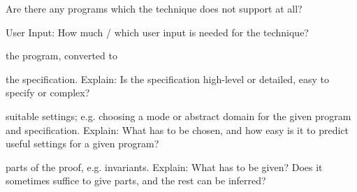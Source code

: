 \documentclass[a4paper]{article}
\begin{document}
\begin{minipage}[t]{0.16\linewidth}
\begin{betterlist}
\begin{betterlist}
\begin{betterlist}
			\end{betterlist}
			\item Are there any programs which the technique does not support at all?

		\end{betterlist}
		\item \alert{User Input:} How much / which user input is needed for the technique?
		\begin{betterlist}
			\item \checkboxChecked the program, converted to

			\item \checkboxHalfChecked the specification. Explain: Is the specification high-level or detailed, easy to specify or complex?

			\item \checkboxChecked suitable settings; e.g. choosing a mode or abstract domain for the given program and specification. Explain: What has to be chosen, and how easy is it to predict useful settings for a given program?

			\item \checkboxUnchecked parts of the proof, e.g. invariants. Explain: What has to be given? Does it sometimes suffice to give parts, and the rest can be inferred?


\end{betterlist}
\end{betterlist}
\end{minipage}
\end{document}
